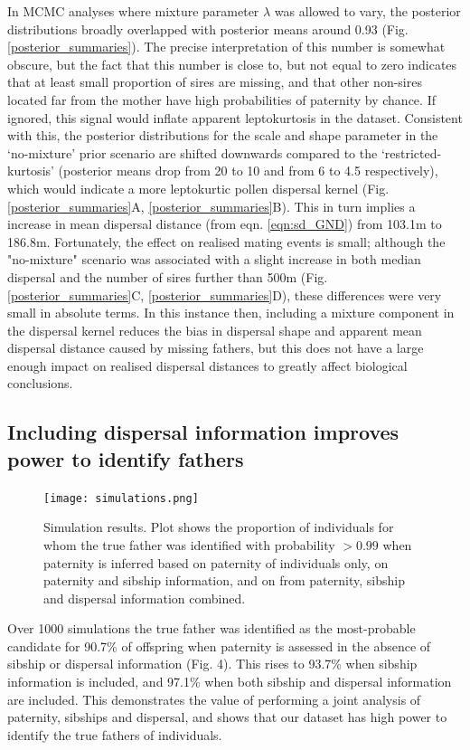 \documentclass[10pt, a4paper, twocolumn]{article} %
\begin{document}
In MCMC analyses where mixture parameter $\lambda$ was allowed to vary, the posterior distributions broadly overlapped with posterior means around 0.93 (Fig. \ref{posterior_summaries}).
The precise interpretation of this number is somewhat obscure, but the fact that this number is close to, but not equal to zero indicates that at least small proportion of sires are missing, and that other non-sires located far from the mother have high probabilities of paternity by chance.
If ignored, this signal would inflate apparent leptokurtosis in the dataset.
Consistent with this, the posterior distributions for the scale and shape parameter in the ‘no-mixture’ prior scenario are shifted downwards compared to the ‘restricted-kurtosis’ (posterior means drop from 20 to 10 and from 6 to 4.5 respectively), which would indicate a more leptokurtic pollen dispersal kernel (Fig. \ref{posterior_summaries}A, \ref{posterior_summaries}B).
This in turn implies a increase in mean dispersal distance (from eqn. \ref{eqn:sd_GND}) from 103.1m to 186.8m.
Fortunately, the effect on realised mating events is small; although the "no-mixture" scenario was associated with a slight increase in both median dispersal and the number of sires further than 500m (Fig. \ref{posterior_summaries}C, \ref{posterior_summaries}D), these differences were very small in absolute terms.
In this instance then, including a mixture component in the dispersal kernel reduces the bias in dispersal shape and apparent mean dispersal distance caused by missing fathers, but this does not have a large enough impact on realised dispersal distances to greatly affect biological conclusions.

\subsection{Including dispersal information improves power to identify fathers}

\begin{figure}
    \texttt{[image: simulations.png]}
    \caption{Simulation results. Plot shows the proportion of individuals for whom the true father was identified with probability $>0.99$ when paternity is inferred based on paternity of individuals only, on paternity and sibship information, and on from paternity, sibship and dispersal information combined.}
    \label{fig:simulations}
\end{figure}

Over 1000 simulations the true father was identified as the most-probable candidate for 90.7\% of offspring when paternity is assessed in the absence of sibship or dispersal information (Fig. 4). This rises to 93.7\% when sibship information is included, and 97.1\% when both sibship and dispersal information are included. This demonstrates the value of performing a joint analysis of paternity, sibships and dispersal, and shows that our dataset has high power to identify the true fathers of individuals.
\end{document}
